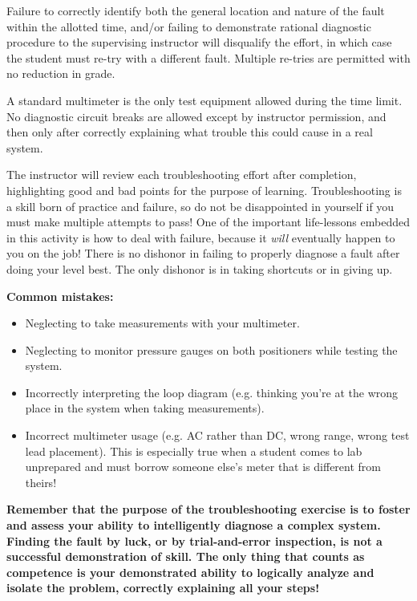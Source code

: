 \begin{itemize}
Failure to correctly identify both the general location and nature of the fault within the allotted time, and/or failing to demonstrate rational diagnostic procedure to the supervising instructor will disqualify the effort, in which case the student must re-try with a different fault.  Multiple re-tries are permitted with no reduction in grade.

A standard multimeter is the only test equipment allowed during the time limit.  No diagnostic circuit breaks are allowed except by instructor permission, and then only after correctly explaining what trouble this could cause in a real system.  

The instructor will review each troubleshooting effort after completion, highlighting good and bad points for the purpose of learning.  Troubleshooting is a skill born of practice and failure, so do not be disappointed in yourself if you must make multiple attempts to pass!  One of the important life-lessons embedded in this activity is how to deal with failure, because it {\it will} eventually happen to you on the job!  There is no dishonor in failing to properly diagnose a fault after doing your level best.  The only dishonor is in taking shortcuts or in giving up.

\vskip 10pt

{\bf Common mistakes:}

\begin{itemize}
\item{} Neglecting to take measurements with your multimeter.
\item{} Neglecting to monitor pressure gauges on both positioners while testing the system.
\item{} Incorrectly interpreting the loop diagram (e.g. thinking you're at the wrong place in the system when taking measurements).
\item{} Incorrect multimeter usage (e.g. AC rather than DC, wrong range, wrong test lead placement).  This is especially true when a student comes to lab unprepared and must borrow someone else's meter that is different from theirs!
\end{itemize}

\vskip 10pt

{\bf Remember that the purpose of the troubleshooting exercise is to foster and assess your ability to intelligently diagnose a complex system.  Finding the fault by luck, or by trial-and-error inspection, is not a successful demonstration of skill.  The only thing that counts as competence is your demonstrated ability to logically analyze and isolate the problem, correctly explaining all your steps!}


\end{itemize}
